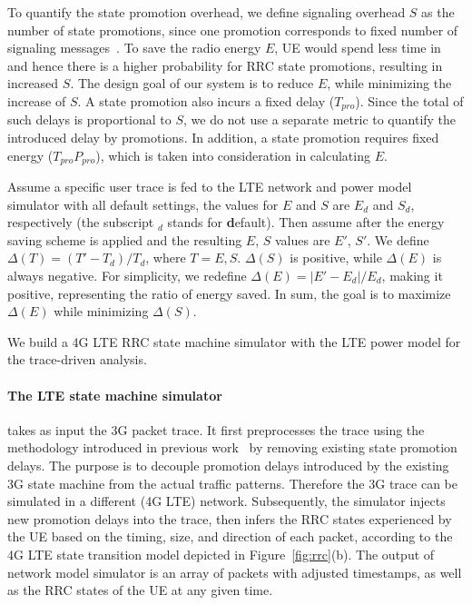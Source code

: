 To quantify the state promotion overhead, we define signaling overhead $S$ as the number of state promotions, since one promotion corresponds to fixed number of signaling messages~\cite{radiojockey}. To save the radio energy $E$, UE would spend less time in \RC and hence there is a higher probability for RRC state promotions, resulting in increased $S$. The design goal of our system is to reduce $E$, while minimizing the increase of $S$. A state promotion also incurs a fixed delay ($T_{pro}$). Since the total of such delays is proportional to $S$, we do not use a separate metric to quantify the introduced delay by promotions. In addition, a state promotion requires fixed energy ($T_{pro}P_{pro}$), which is taken into consideration in calculating $E$.

Assume a specific user trace is fed to the LTE network and power model simulator with all default settings, the values for $E$ and $S$ are $E_{d}$ and $S_{d}$, respectively (the subscript $_{d}$ stands for \textbf{d}efault). Then assume after the energy saving scheme is applied and the resulting $E$, $S$ values are $E'$, $S'$. We define $\Delta(T) = (T' - T_{d}) / T_{d}$, where $T = E, S$. $\Delta(S)$ is positive, while $\Delta(E)$ is always negative. For simplicity, we redefine $\Delta(E) = |E' - E_{d}| / E_{d}$, making it positive, representing the ratio of energy saved. In sum, the goal is to maximize $\Delta(E)$ while minimizing $\Delta(S)$.




\label{sec:model}
We build a 4G LTE RRC state machine simulator with the LTE power model for the trace-driven analysis.

\paragraph{The LTE state machine simulator} takes as input the 3G packet trace. It first preprocesses the trace using the methodology introduced in previous work~\cite{imc.3g} by removing existing state promotion delays. The purpose is to decouple promotion delays introduced by the existing 3G state machine from the actual traffic patterns. Therefore the 3G trace can be simulated in a different (4G LTE) network. Subsequently, the simulator injects new promotion delays into the trace, then infers the RRC states experienced by the UE based on the timing, size, and direction of each packet, according to the 4G LTE state transition model depicted in Figure~\ref{fig:rrc}(b). The output of network model simulator is an array of packets with adjusted timestamps, as well as the RRC states of the UE at any given time.

